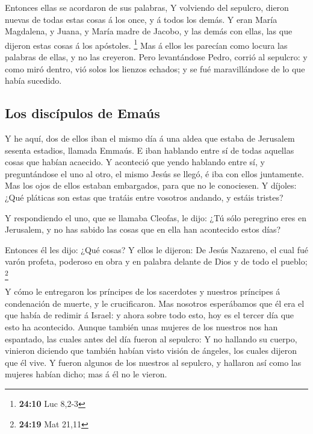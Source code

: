  Entonces ellas se acordaron de sus palabras,  Y
volviendo del sepulcro, dieron nuevas de todas estas cosas á los once, y
á todos los demás.  Y eran María Magdalena, y Juana, y
María madre de Jacobo, y las demás con ellas, las que dijeron estas
cosas á los apóstoles. \footnote{\textbf{24:10} Luc 8,2-3} 
Mas á ellos les parecían como locura las palabras de ellas, y no las
creyeron.  Pero levantándose Pedro, corrió al sepulcro: y
como miró dentro, vió solos los lienzos echados; y se fué maravillándose
de lo que había sucedido.

\hypertarget{los-discuxedpulos-de-emauxfas}{%
\subsection{Los discípulos de
Emaús}\label{los-discuxedpulos-de-emauxfas}}

 Y he aquí, dos de ellos iban el mismo día á una aldea que
estaba de Jerusalem sesenta estadios, llamada Emmaús.  E
iban hablando entre sí de todas aquellas cosas que habían acaecido.
 Y aconteció que yendo hablando entre sí, y preguntándose
el uno al otro, el mismo Jesús se llegó, é iba con ellos juntamente.
 Mas los ojos de ellos estaban embargados, para que no le
conociesen.  Y díjoles: ¿Qué pláticas son estas que tratáis
entre vosotros andando, y estáis tristes?

 Y respondiendo el uno, que se llamaba Cleofas, le dijo:
¿Tú sólo peregrino eres en Jerusalem, y no has sabido las cosas que en
ella han acontecido estos días?

 Entonces él les dijo: ¿Qué cosas? Y ellos le dijeron: De
Jesús Nazareno, el cual fué varón profeta, poderoso en obra y en palabra
delante de Dios y de todo el pueblo; \footnote{\textbf{24:19} Mat 21,11}

 Y cómo le entregaron los príncipes de los sacerdotes y
nuestros príncipes á condenación de muerte, y le crucificaron.
 Mas nosotros esperábamos que él era el que había de
redimir á Israel: y ahora sobre todo esto, hoy es el tercer día que esto
ha acontecido.  Aunque también unas mujeres de los nuestros
nos han espantado, las cuales antes del día fueron al sepulcro:
 Y no hallando su cuerpo, vinieron diciendo que también
habían visto visión de ángeles, los cuales dijeron que él vive.
 Y fueron algunos de los nuestros al sepulcro, y hallaron
así como las mujeres habían dicho; mas á él no le vieron.

